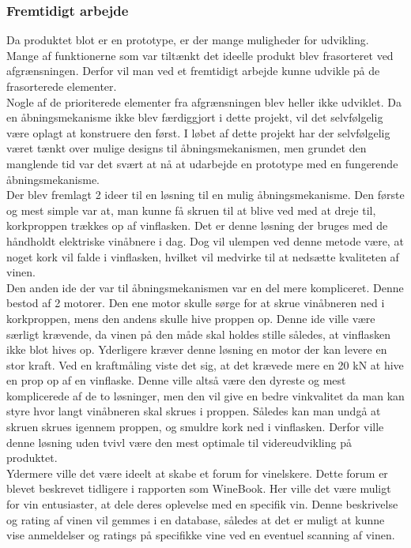 \subsubsection{Fremtidigt arbejde}

Da produktet blot er en prototype, er der mange muligheder for udvikling. Mange af funktionerne som var tiltænkt det ideelle produkt blev frasorteret ved afgrænsningen. Derfor vil man ved et fremtidigt arbejde kunne udvikle på de frasorterede elementer.
\\

Nogle af de prioriterede elementer fra afgrænsningen blev heller ikke udviklet. Da en åbningsmekanisme ikke blev færdiggjort i dette projekt, vil det selvfølgelig være oplagt at konstruere den først. I løbet af dette projekt har der selvfølgelig været tænkt over mulige designs til åbningsmekanismen, men grundet den manglende tid var det svært at nå at udarbejde en prototype med en fungerende åbningsmekanisme. 
\\

Der blev fremlagt 2 ideer til en løsning til en mulig åbningsmekanisme. Den første og mest simple var at, man kunne få skruen til at blive ved med at dreje til, korkproppen trækkes op af vinflasken. Det er denne løsning der bruges med de håndholdt elektriske vinåbnere i dag. Dog vil ulempen ved denne metode være, at noget kork vil falde i vinflasken, hvilket vil medvirke til at nedsætte kvaliteten af vinen.
\\

Den anden ide der var til åbningsmekanismen var en del mere kompliceret. Denne bestod af 2 motorer. Den ene motor skulle sørge for at skrue vinåbneren ned i korkproppen, mens den andens skulle hive proppen op. Denne ide ville være særligt krævende, da vinen på den måde skal holdes stille således, at vinflasken ikke blot hives op. Yderligere kræver denne løsning en motor der kan levere en stor kraft. Ved en kraftmåling viste det sig, at det krævede mere en 20 kN at hive en prop op af en vinflaske. Denne ville altså være den dyreste og mest komplicerede af de to løsninger, men den vil give en bedre vinkvalitet da man kan styre hvor langt vinåbneren skal skrues i proppen. Således kan man undgå at skruen skrues igennem proppen, og smuldre kork ned i vinflasken. Derfor ville denne løsning uden tvivl være den mest optimale til videreudvikling på produktet.
\\

Ydermere ville det være ideelt at skabe et forum for vinelskere. Dette forum er blevet beskrevet tidligere i rapporten som WineBook. Her ville det være muligt for vin entusiaster, at dele deres oplevelse med en specifik vin. Denne beskrivelse og rating af vinen vil gemmes i en database, således at det er muligt at kunne vise anmeldelser og ratings på specifikke vine ved en eventuel scanning af vinen.
\\

